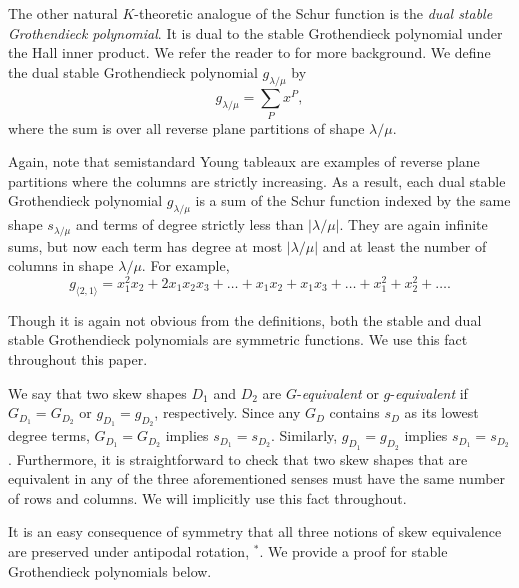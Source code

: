 \documentclass[12pt]{amsart}
\theoremstyle{definition}
\begin{document}
The other natural $K$-theoretic analogue of the Schur function is the \textit{dual stable Grothendieck polynomial}. It is dual to the stable Grothendieck polynomial under the Hall inner product. We refer the reader to \cite{lam2007combinatorial} for more background. We define the dual stable Grothendieck polynomial $g_{\lambda / \mu}$ by
$$g_{\lambda / \mu} = \sum_{P}^{}x^P,$$
where the sum is over all reverse plane partitions of shape $\lambda / \mu$.

Again, note that semistandard Young tableaux are examples of reverse plane partitions where the columns are strictly increasing. As a result, each dual stable Grothendieck polynomial $g_{\lambda/\mu}$ is a sum of the Schur function indexed by the same shape $s_{\lambda/\mu}$ and terms of degree strictly less than $|\lambda/\mu|$. They are again infinite sums, but now each term has degree at most $|\lambda/\mu|$ and at least the number of columns in shape $\lambda/\mu$. For example,
\[g_{\langle 2,1\rangle}=x_1^2x_2+2x_1x_2x_3+\ldots+x_1x_2+x_1x_3+\ldots+x_1^2+x_2^2+\ldots.\]

Though it is again not obvious from the definitions, both the stable and dual stable Grothendieck polynomials are symmetric functions. We use this fact throughout this paper.

We say that two skew shapes $D_1$ and $D_2$ are $G$-\textit{equivalent} or $g$-\textit{equivalent} if $G_{D_1} = G_{D_2}$ or $g_{D_1} = g_{D_2}$, respectively. Since any $G_D$ contains $s_D$ as its lowest degree terms, $G_{D_1}=G_{D_2}$ implies $s_{D_1}=s_{D_2}$. Similarly, $g_{D_1}=g_{D_2}$ implies $s_{D_1}=s_{D_2}$.
Furthermore, it is straightforward to check that two skew shapes that are equivalent in any of the three aforementioned senses must have the same number of rows and columns. We will implicitly use this fact throughout.

It is an easy consequence of symmetry that all three notions of skew equivalence are preserved under antipodal rotation, $^*$. We provide a proof for stable Grothendieck polynomials below.
\end{document}
